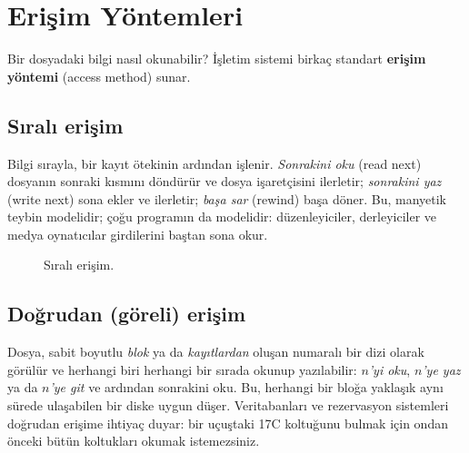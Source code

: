 \documentclass[11pt,a4paper]{article}
\newcommand{\term}[1]{\textbf{\color{mintdeep}#1}}
\begin{document}
\section{Erişim Yöntemleri}

Bir dosyadaki bilgi nasıl okunabilir? İşletim sistemi birkaç standart \term{erişim yöntemi} (access method) sunar.

\subsection{Sıralı erişim}

Bilgi sırayla, bir kayıt ötekinin ardından işlenir. \emph{Sonrakini oku} (read next) dosyanın sonraki kısmını döndürür ve dosya işaretçisini ilerletir; \emph{sonrakini yaz} (write next) sona ekler ve ilerletir; \emph{başa sar} (rewind) başa döner. Bu, manyetik teybin modelidir; çoğu programın da modelidir: düzenleyiciler, derleyiciler ve medya oynatıcılar girdilerini baştan sona okur.

\begin{figure}[H]
\centering
{}
\caption{Sıralı erişim.}
\end{figure}

\subsection{Doğrudan (göreli) erişim}

Dosya, sabit boyutlu \emph{blok} ya da \emph{kayıtlardan} oluşan numaralı bir dizi olarak görülür ve herhangi biri herhangi bir sırada okunup yazılabilir: \emph{$n$'yi oku}, \emph{$n$'ye yaz} ya da \emph{$n$'ye git} ve ardından sonrakini oku. Bu, herhangi bir bloğa yaklaşık aynı sürede ulaşabilen bir diske uygun düşer. Veritabanları ve rezervasyon sistemleri doğrudan erişime ihtiyaç duyar: bir uçuştaki 17C koltuğunu bulmak için ondan önceki bütün koltukları okumak istemezsiniz.
\end{document}
